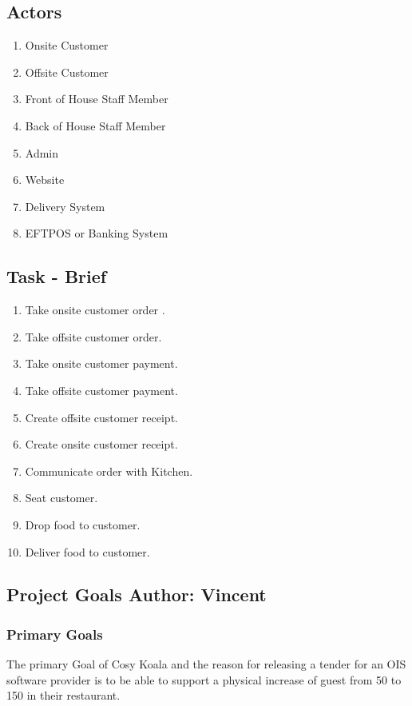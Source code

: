 \documentclass{article}
\begin{document}
\subsection{Actors}
\begin{enumerate}
    \item Onsite Customer
    \item Offsite Customer
    \item Front of House Staff Member
    \item Back of House Staff Member
    \item Admin
    \item Website
    \item Delivery System
    \item EFTPOS or Banking System
\end{enumerate}

\subsection{Task - Brief}
\begin{enumerate}
    \item Take onsite customer order .
    \item Take offsite customer order.
    \item Take onsite customer payment.
    \item Take offsite customer payment.
    \item Create offsite customer receipt.
    \item Create onsite customer receipt.
    \item Communicate order with Kitchen.
    \item Seat customer.
    \item Drop food to customer.
    \item Deliver food to customer.
\end{enumerate}


\subsection{Project Goals \normalsize\textbf{Author: Vincent}}
\subsubsection{Primary Goals}
The primary Goal of Cosy Koala and the reason for releasing a tender for an OIS software provider is to be able to support a physical increase of guest from 50 to 150 in their restaurant.
\end{document}
